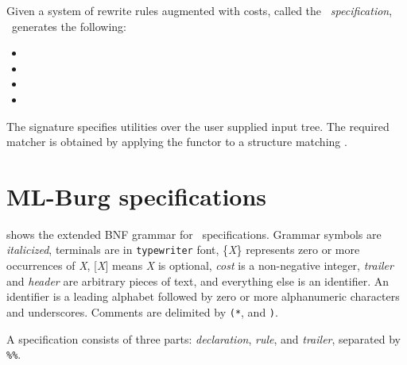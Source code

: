 Given a system of rewrite rules augmented with costs, called the {\em
\mlburg\ specification}, \mlburg\ generates the following:

\begin{itemize}
	\item{}
	\item{}
	\item{}
	\item{}
\end{itemize}

The signature  specifies utilities over the 
user supplied input
tree. The required matcher is obtained by applying the functor
 to a structure matching .



		\section{ML-Burg specifications}

 shows the extended BNF grammar for 
\mlburg\ specifications. Grammar symbols are {\it italicized}, terminals
are in {\tt typewriter} font, \{{\it X}\} represents zero or more
occurrences of {\it X}, {\rm [}{\it X}{\rm ]} means {\it X} is optional, 
{\sl cost} is a non-negative integer, {\sl trailer} and {\sl header}
are arbitrary pieces of text, and everything else is an identifier.
An identifier is a leading alphabet followed by zero or more
alphanumeric characters and underscores. Comments are delimited
by {\tt (*}, and {\tt *)}. 

A specification consists of three parts: {\it declaration}, {\it rule},
and {\sl trailer}, separated by \verb|%%|.



